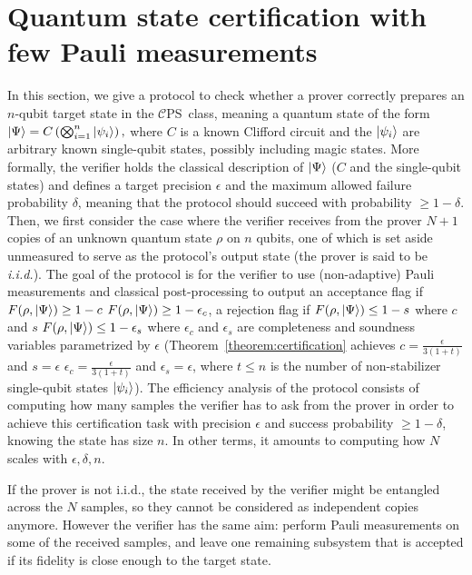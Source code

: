 \documentclass[a4paper,twocolumn,11pt,unpublished]{../../revision/quantumarticle}
\newcommand{\CEPS}{$\mathcal C$PS}
\providecommand{\DIFadd}[1]{{\protect\color{blue} \sf #1}} %
\providecommand{\DIFdel}[1]{{\protect\color{red} \scriptsize #1}} %
\providecommand{\DIFaddbegin}{} %
\providecommand{\DIFaddend}{} %
\providecommand{\DIFdelbegin}{} %
\providecommand{\DIFdelend}{} %
\begin{document}
\section{Quantum state certification with few Pauli measurements}
\label{section:certification}
In this section, we give a protocol to check whether a prover correctly prepares an $n$-qubit target state in the \CEPS\ class, meaning a quantum state of the form
        \(
        \ket{\Psi} = C\left(\bigotimes_{i=1}^n \ket{\psi_i}\right),
        \)
        where $C$ is a known Clifford circuit and the $\ket{\psi_i}$ are arbitrary known single-qubit states, possibly including magic states.
        More formally, 
%
%
the verifier holds the classical description of $\ket\Psi$ ($C$ and the single-qubit states) and defines a target precision $\epsilon$ and the maximum allowed failure probability $\delta$, meaning that the protocol should succeed with probability $\geq 1-\delta$. Then, we first consider the case where the verifier receives from the prover $N+1$ copies of an unknown quantum state $\rho$ on $n$ qubits, one of which is set aside unmeasured to serve as the protocol's output state (the prover is said to be \textit{i.i.d.}).
%
The goal of the protocol is for the verifier to use (non-adaptive) Pauli measurements and classical post-processing to output an acceptance flag if \DIFdelbegin \DIFdel{$F(\rho, \ket\Psi) \geq 1-c$}\DIFdelend \DIFaddbegin \DIFadd{$F(\rho, \ket\Psi) \geq 1-\epsilon_c$}\DIFaddend , a rejection flag if \DIFdelbegin \DIFdel{$F(\rho, \ket\Psi)\leq 1-s$ where $c$ and $s$ }\DIFdelend \DIFaddbegin \DIFadd{$F(\rho, \ket\Psi)\leq 1-\epsilon_s$ where $\epsilon_c$ and $\epsilon_s$ }\DIFaddend are completeness and soundness variables parametrized by $\epsilon$ (Theorem~\ref{theorem:certification} achieves \DIFdelbegin \DIFdel{$c=\frac{\epsilon}{3(1+t)}$ and $s=\epsilon$}\DIFdelend \DIFaddbegin \DIFadd{$\epsilon_c=\frac{\epsilon}{3(1+t)}$ and $\epsilon_s=\epsilon$}\DIFaddend , where $t\le n$ is the number of non-stabilizer single-qubit states $\ket{\psi_i}$).
The efficiency analysis of the protocol consists of computing how many samples the verifier has to ask from the prover in order to achieve this certification task with precision $\epsilon$ and success probability $\geq1-\delta$, knowing the state has size $n$. In other terms, it amounts to computing how $N$ scales with $\epsilon, \delta, n$.

If the prover is not i.i.d., the state received by the verifier might be entangled across the $N$ samples, so they cannot be considered as independent copies anymore. However the verifier has the same aim: perform Pauli measurements on some of the received samples, and leave one remaining subsystem that is accepted if its fidelity is close enough to the target state.
\end{document}
